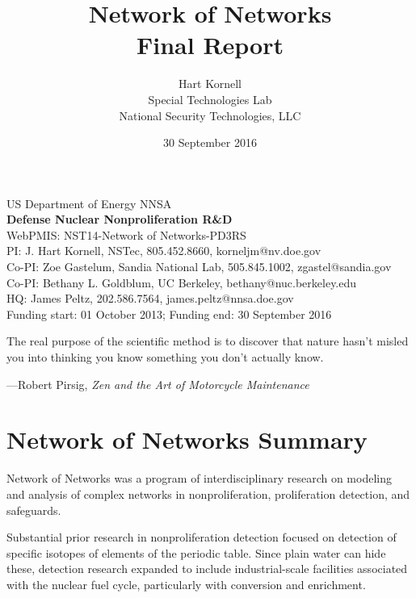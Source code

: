 \documentclass{article} %
\title{Network of Networks\\Final Report}
\author{Hart Kornell\\ Special Technologies Lab\\National Security Technologies, LLC}
\date{30 September 2016}
\begin{document}
\maketitle

\vfill
\begin{center}
US Department of Energy NNSA \\
\textbf{Defense Nuclear Nonproliferation R\&D} \\
WebPMIS: NST14-Network of Networks-PD3RS  \\
PI: J. Hart Kornell, NSTec, 805.452.8660, korneljm@nv.doe.gov \\
Co-PI: Zoe Gastelum, Sandia National Lab, 505.845.1002, zgastel@sandia.gov \\
Co-PI: Bethany L. Goldblum, UC Berkeley, bethany@nuc.berkeley.edu \\
HQ: James Peltz, 202.586.7564, james.peltz@nnsa.doe.gov \\
Funding start: 01 October 2013; Funding end: 30 September 2016
\end{center}
\newpage
\thispagestyle{empty}
\mbox{}
\newpage
\pagebreak
\hspace{0pt}
\vfill
\quote
The real purpose of the scientific method is to discover that nature hasn't misled you into thinking you know something you don't actually know. 

---Robert Pirsig, \textit{Zen and the Art of Motorcycle Maintenance}
\endquote
\vfill
\hspace{0pt}
\pagebreak

\newpage
\thispagestyle{empty}
\mbox{}
\newpage

\onehalfspace

\tableofcontents{}

\newpage
\thispagestyle{empty}
\mbox{}
\newpage

\section*{Network of Networks Summary}
\noindent Network of Networks was a program of  interdisciplinary research on modeling and analysis of complex networks in nonproliferation, proliferation detection, and safeguards. 

Substantial prior research in nonproliferation detection focused on detection of specific isotopes of elements of the periodic table. Since plain water can hide these, detection research expanded to include industrial-scale facilities associated with the nuclear fuel cycle, particularly with conversion and enrichment. 
\end{document}
